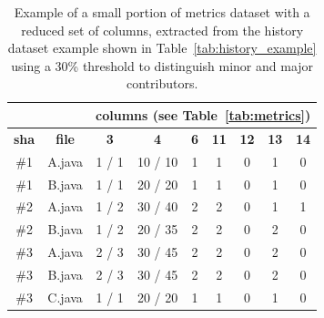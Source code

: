 \begin{table}[ht]
\centering
\footnotesize
\begin{tabular}{|c|c|c|c|c|c|c|c|c|}
\cline{3-9}
\multicolumn{1}{c}{} & 
\multicolumn{1}{c}{} & \multicolumn{7}{|c|}{\textbf{columns (see Table~\ref{tab:metrics})}} \\
\hline
\textbf{sha} & \textbf{file} & \textbf{3} & \textbf{4} & \textbf{6} & \textbf{11} & \textbf{12} & \textbf{13} & \textbf{14}
\\
\hline
\#1 & A.java & 1 / 1             & 10 / 10                & 1                   & 1                   & 0                   & 1                                 & 0                                 \\
\#1 & B.java & 1 / 1             & 20 / 20                & 1                   & 1                   & 0                   & 1                                 & 0                                 \\
\#2 & A.java & 1 / 2             & 30 / 40                & 2                   & 2                   & 0                   & 1                                 & 1                                 \\
\#2 & B.java & 1 / 2             & 20 / 35                & 2                   & 2                   & 0                   & 2                                 & 0                                 \\
\#3 & A.java & 2 / 3             & 30 / 45                & 2                   & 2                   & 0                   & 2                                 & 0                                 \\
\#3 & B.java & 2 / 3             & 30 / 45                & 2                   & 2                   & 0                   & 2                                 & 0                                 \\
\#3 & C.java & 1 / 1             & 20 / 20                & 1                   & 1                   & 0                   & 1                                 & 0                 
\\ \hline
\end{tabular}
\caption{Example of a small portion of metrics dataset with a reduced set of columns, extracted from the history dataset example shown in Table~\ref{tab:history_example} using a 30\% threshold to distinguish minor and major contributors.}
\label{tab:metrics_example}
\end{table}

